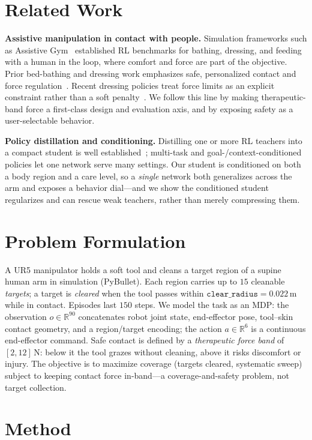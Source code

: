 \documentclass[conference]{IEEEtran}
\begin{document}
\section{Related Work}
\textbf{Assistive manipulation in contact with people.} Simulation frameworks such as
Assistive Gym~\cite{erickson2020assistive} established RL benchmarks for bathing, dressing, and
feeding with a human in the loop, where comfort and force are part of the objective. Prior
bed-bathing and dressing work emphasizes safe, personalized contact and force
regulation~\cite{erickson2018dressing,kapusta2019bedside}. Recent dressing policies treat
force limits as an explicit constraint rather than a soft
penalty~\cite{zhang2023forceconstrained}. We follow this line by making therapeutic-band force
a first-class design and evaluation axis, and by exposing safety as a user-selectable behavior.

\textbf{Policy distillation and conditioning.} Distilling one or more RL teachers into a
compact student is well established~\cite{rusu2016distillation}; multi-task and
goal-/context-conditioned policies let one network serve many settings. Our student is
conditioned on both a body region and a care level, so a \emph{single} network both generalizes
across the arm and exposes a behavior dial---and we show the conditioned student regularizes
and can rescue weak teachers, rather than merely compressing them.

\section{Problem Formulation}
A UR5 manipulator holds a soft tool and cleans a target region of a supine human arm in
simulation (PyBullet). Each region carries up to $15$ cleanable \emph{targets}; a target is
\emph{cleared} when the tool passes within $\texttt{clear\_radius}{=}0.022$\,m while in
contact. Episodes last $150$ steps. We model the task as an MDP: the observation
$o\in\mathbb{R}^{90}$ concatenates robot joint state, end-effector pose, tool--skin contact
geometry, and a region/target encoding; the action $a\in\mathbb{R}^{6}$ is a continuous
end-effector command. Safe contact is defined by a \emph{therapeutic force band} of
$[2,12]$\,N: below it the tool grazes without cleaning, above it risks discomfort or injury.
The objective is to maximize coverage (targets cleared, systematic sweep) subject to keeping
contact force in-band---a coverage-and-safety problem, not target collection.

\section{Method}
\end{document}
